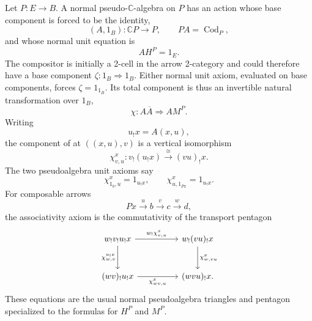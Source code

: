 \documentclass[11pt]{article}
\theoremstyle{plain}
\theoremstyle{definition}
\theoremstyle{remark}
\newcommand{\Cod}{\operatorname{Cod}}
\newcommand{\C}{\mathbb{C}}
\numberwithin{equation}{section}
\begin{document}
Let $P\colon E\to B$.  A normal pseudo-$\C$-algebra on $P$ has an
action whose base component is forced to be the identity,
\begin{equation*}
  (A,1_B)\colon\C P\longrightarrow P,
  \qquad PA=\Cod_P,
\end{equation*}
and whose normal unit equation is
\begin{equation}
  AH^P=1_E.
  \label{eq:normal-pseudo-unit}
\end{equation}
The compositor is initially a 2-cell in the arrow 2-category and could
therefore have a base component
$\zeta\colon1_B\Rightarrow1_B$.  Either normal unit axiom, evaluated on
base components, forces $\zeta=1_{1_B}$.  Its total component is thus an
invertible natural transformation over $1_B$,
\begin{equation}
  \chi\colon A\overline A\Longrightarrow AM^P.
  \label{eq:C-pseudo-compositor}
\end{equation}
Writing
\begin{equation*}
  u_!x=A(x,u),
\end{equation*}
the component of  at
$((x,u),v)$ is a vertical isomorphism
\begin{equation}
  \chi^x_{v,u}\colon v_!(u_!x)\xrightarrow{\ \cong\ }(vu)_!x.
  \label{eq:transport-compositor}
\end{equation}
The two pseudoalgebra unit axioms say
\begin{equation}
  \chi^x_{1_b,u}=1_{u_!x},
  \qquad
  \chi^x_{u,1_{Px}}=1_{u_!x}.
  \label{eq:transport-unit-coherence}
\end{equation}
For composable arrows
\begin{equation*}
  Px\xrightarrow{u}b\xrightarrow{v}c\xrightarrow{w}d,
\end{equation*}
the associativity axiom is the commutativity of the transport pentagon
\begin{equation}
\begin{tikzcd}[column sep=huge,row sep=large]
w_!v_!u_!x
  \arrow[r,"{w_!\chi^x_{v,u}}"]
  \arrow[d,"{\chi^{u_!x}_{w,v}}"']
& w_!(vu)_!x
  \arrow[d,"{\chi^x_{w,vu}}"] \\
(wv)_!u_!x
  \arrow[r,"{\chi^x_{wv,u}}"']
& (wvu)_!x .
\end{tikzcd}
\label{eq:transport-pentagon}
\end{equation}
These equations are the usual normal pseudoalgebra triangles and
pentagon specialized to the formulas for $H^P$ and $M^P$.
\end{document}
